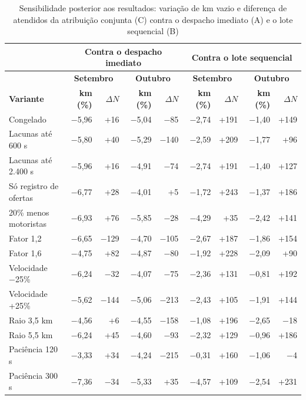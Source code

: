 \begin{table}[!htb]
\caption{Sensibilidade posterior aos resultados: variação de km vazio e diferença de atendidos da atribuição conjunta (C) contra o despacho imediato (A) e o lote sequencial (B)}\label{tab:sens}
\centering\fontetabela\setlength{\tabcolsep}{3pt}\renewcommand{\arraystretch}{1.12}
\begin{tabular}{|l|r|r|r|r|r|r|r|r|}
\hline
 & \multicolumn{4}{|c|}{\textbf{Contra o despacho imediato}} & \multicolumn{4}{|c|}{\textbf{Contra o lote sequencial}} \\
\hline
 & \multicolumn{2}{|c|}{\textbf{Setembro}} & \multicolumn{2}{|c|}{\textbf{Outubro}} & \multicolumn{2}{|c|}{\textbf{Setembro}} & \multicolumn{2}{|c|}{\textbf{Outubro}} \\
\hline
\textbf{Variante} & \textbf{km (\%)} & \textbf{$\Delta N$} & \textbf{km (\%)} & \textbf{$\Delta N$} & \textbf{km (\%)} & \textbf{$\Delta N$} & \textbf{km (\%)} & \textbf{$\Delta N$} \\
\hline
Congelado & −5,96 & +16 & −5,04 & −85 & −2,74 & +191 & −1,40 & +149 \\
\hline
Lacunas até 600 s & −5,80 & +40 & −5,29 & −140 & −2,59 & +209 & −1,77 & +96 \\
\hline
Lacunas até 2.400 s & −5,96 & +16 & −4,91 & −74 & −2,74 & +191 & −1,40 & +127 \\
\hline
Só registro de ofertas & −6,77 & +28 & −4,01 & +5 & −1,72 & +243 & −1,37 & +186 \\
\hline
20\% menos motoristas & −6,93 & +76 & −5,85 & −28 & −4,29 & +35 & −2,42 & +141 \\
\hline
Fator 1,2 & −6,65 & −129 & −4,70 & −105 & −2,67 & +187 & −1,86 & +154 \\
\hline
Fator 1,6 & −4,75 & +82 & −4,87 & −80 & −1,92 & +228 & −2,09 & +90 \\
\hline
Velocidade −25\% & −6,24 & −32 & −4,07 & −75 & −2,36 & +131 & −0,81 & +192 \\
\hline
Velocidade +25\% & −5,62 & −144 & −5,06 & −213 & −2,43 & +105 & −1,91 & +144 \\
\hline
Raio 3,5 km & −4,56 & +6 & −4,55 & −158 & −1,08 & +196 & −2,65 & −18 \\
\hline
Raio 5,5 km & −6,24 & +45 & −4,60 & −93 & −2,32 & +129 & −0,96 & +186 \\
\hline
Paciência 120 s & −3,33 & +34 & −4,24 & −215 & −0,31 & +160 & −1,06 & −4 \\
\hline
Paciência 300 s & −7,36 & −34 & −5,33 & +35 & −4,57 & +109 & −2,54 & +231 \\

\end{tabular}
\end{table}
